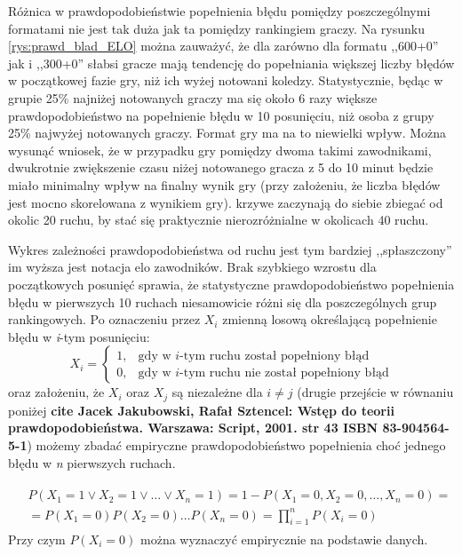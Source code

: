 \documentclass[inzynierska]{pwr_wmat_praca_dyplomowa}
\theoremstyle{plain}
\numberwithin{theorem}{chapter}
\theoremstyle{definition}
\numberwithin{theorem}{chapter}
\begin{document}
Różnica w prawdopodobieństwie popełnienia błędu pomiędzy poszczególnymi formatami nie jest tak duża jak ta pomiędzy rankingiem graczy. Na rysunku \ref{rys:prawd_blad_ELO} można zauważyć, że dla zarówno dla formatu ,,600+0'' jak i ,,300+0'' słabsi gracze mają tendencję do popełniania większej liczby błędów w początkowej fazie gry, niż ich wyżej notowani koledzy. Statystycznie, będąc w grupie 25\% najniżej notowanych graczy ma się około 6 razy większe prawdopodobieństwo na popełnienie błędu w 10 posunięciu, niż osoba z grupy 25\% najwyżej notowanych graczy. Format gry ma na to niewielki wpływ. Można wysunąć wniosek, że w przypadku gry pomiędzy dwoma takimi zawodnikami, dwukrotnie zwiększenie czasu niżej notowanego gracza z 5 do 10 minut będzie miało minimalny wpływ na finalny wynik gry (przy założeniu, że liczba błędów jest mocno skorelowana z wynikiem gry). krzywe zaczynają do siebie zbiegać od okolic 20 ruchu, by stać się praktycznie nierozróżnialne w okolicach 40 ruchu.

Wykres zależności prawdopodobieństwa od ruchu jest tym bardziej ,,spłaszczony'' im wyższa jest notacja elo zawodników. Brak szybkiego wzrostu dla początkowych posunięć sprawia, że statystyczne prawdopodobieństwo popełnienia błędu w pierwszych 10 ruchach niesamowicie różni się dla poszczególnych grup rankingowych.  Po oznaczeniu przez $X_i$ zmienną losową określającą popełnienie błędu w \textit{i}-tym posunięciu:
\begin{equation*}
X_i =
\begin{cases}
	1, & \text{gdy w $i$-tym ruchu został popełniony błąd}\\
	0, & \text{gdy w $i$-tym ruchu nie został popełniony błąd}
\end{cases}       
\end{equation*}
oraz założeniu, że $X_i$ oraz $X_j$ są niezależne dla $i \neq j$ (drugie przejście w równaniu poniżej \textbf{cite Jacek Jakubowski, Rafał Sztencel: Wstęp do teorii prawdopodobieństwa. Warszawa: Script, 2001. str 43 ISBN 83-904564-5-1}) możemy zbadać empiryczne prawdopodobieństwo popełnienia choć jednego błędu w \textit{n} pierwszych ruchach.

\begin{multline}
	\begin{split}
	& P(X_1 = 1 \vee X_2 = 1 \vee \dots \vee X_n = 1)  = 1 - P(X_1 = 0, X_2 = 0,\dots, X_n = 0) = \\
	& = P(X_1 = 0)P(X_2 = 0)\dots P(X_n = 0) = \prod_{i=1}^{n}P(X_i=0)
	\end{split}
\end{multline}
Przy czym $P(X_i=0)$ można wyznaczyć empirycznie na podstawie danych.\\
\end{document}
